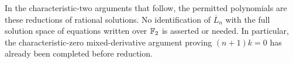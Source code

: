 In the characteristic-two arguments that follow, the permitted
polynomials are these reductions of rational solutions.  No
identification of \(\overline L_n\) with the full solution space of
equations written over \({\mathbb F_2}\) is asserted or needed.  In particular,
the characteristic-zero mixed-derivative argument proving
\((n+1)k=0\) has already been completed before reduction.

